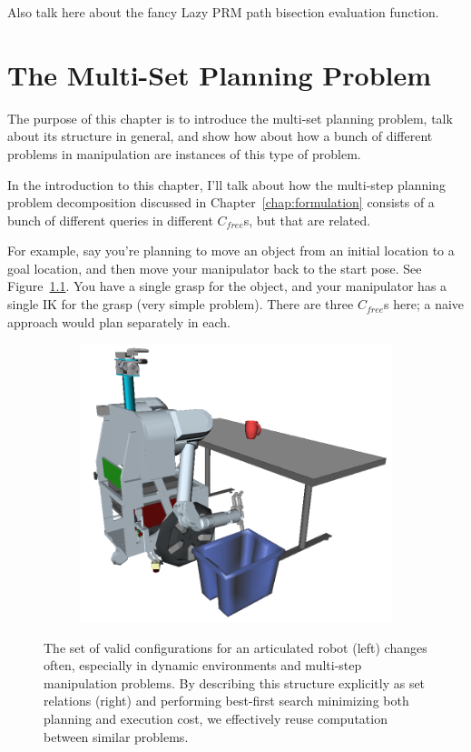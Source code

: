 \documentclass{report}
\begin{document}
Also talk here about the fancy Lazy PRM path bisection
evaluation function.


\newpage
\chapter{The Multi-Set Planning Problem}
\label{chap:multi-set}

The purpose of this chapter is to introduce the multi-set planning
problem,
talk about its structure in general,
and show how about how a bunch of different problems in manipulation
are instances of this type of problem.

In the introduction to this chapter,
I'll talk about how the multi-step planning problem decomposition
discussed in Chapter~\ref{chap:formulation}
consists of a bunch of different queries in different
$C_{free}$s, but that are related.

For example, say you're planning to move an object from an initial
location to a goal location,
and then move your manipulator back to the start pose.
See Figure~\ref{fig:manip-example}.
You have a single grasp for the object,
and your manipulator has a single IK for the grasp (very simple problem).
There are three $C_{free}$s here;
a naive approach would plan separately in each.

\begin{figure}
\centering
\begin{subfigure}[b]{.45\linewidth}
\includegraphics[width=\columnwidth]{figs/simple-table-clearing-task.png}
\end{subfigure}%
\quad%
\begin{subfigure}[b]{.45\linewidth}

\end{subfigure}
\caption{
  The set of valid configurations for an articulated robot (left)
  changes often,
  especially in dynamic environments
  and multi-step manipulation problems.
  By describing this structure explicitly as set relations (right)
  and performing best-first search
  minimizing both planning and execution cost,
  we effectively reuse computation between similar
  problems.}
\label{fig:manip-example}
\end{figure}
\end{document}
